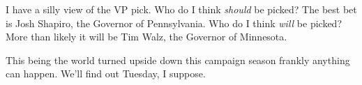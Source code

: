 I have a silly view of the VP pick. Who do I think \emph{should} be
picked? The best bet is Josh Shapiro, the Governor of Pennsylvania. Who
do I think \emph{will} be picked? More than likely it will be Tim Walz,
the Governor of Minnesota.

This being the world turned upside down this campaign season frankly
anything can happen. We'll find out Tuesday, I suppose.
